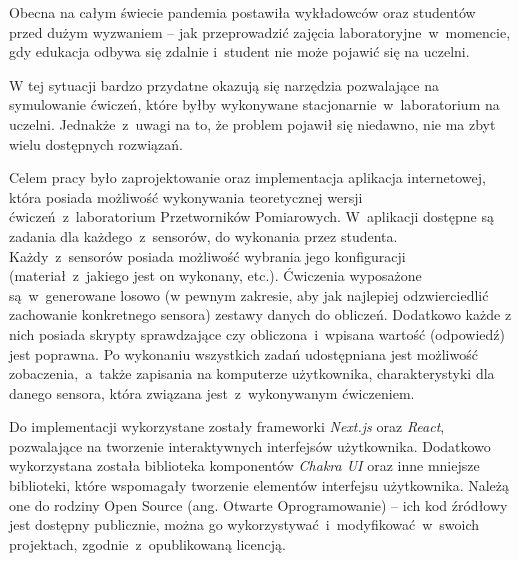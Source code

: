 Obecna na całym świecie pandemia postawiła wykładowców oraz studentów przed dużym wyzwaniem -- jak
przeprowadzić zajęcia laboratoryjne~w~momencie, gdy edukacja odbywa się zdalnie i~student nie może
pojawić się na uczelni.

W tej sytuacji bardzo przydatne okazują się narzędzia pozwalające na symulowanie ćwiczeń, które
byłby wykonywane stacjonarnie~w~laboratorium na uczelni. Jednakże~z~uwagi na to, że
problem pojawił się niedawno, nie ma zbyt wielu dostępnych rozwiązań.

Celem pracy było zaprojektowanie oraz implementacja aplikacja internetowej, która posiada możliwość
wykonywania teoretycznej wersji ćwiczeń~z~laboratorium Przetworników Pomiarowych. W~aplikacji
dostępne są zadania dla każdego~z~sensorów, do wykonania przez studenta. Każdy~z~sensorów posiada
możliwość wybrania jego konfiguracji (materiał~z~jakiego jest on wykonany, etc.). Ćwiczenia
wyposażone są~w~generowane losowo (w pewnym zakresie, aby jak najlepiej odzwierciedlić zachowanie
konkretnego sensora) zestawy danych do obliczeń. Dodatkowo każde z nich posiada skrypty sprawdzające
czy obliczona~i~wpisana wartość (odpowiedź) jest poprawna. Po wykonaniu wszystkich zadań
udostępniana jest możliwość zobaczenia,~a~także zapisania na komputerze użytkownika, charakterystyki
dla danego sensora, która związana jest~z~wykonywanym ćwiczeniem.

Do implementacji wykorzystane zostały frameworki \textit{Next.js} oraz \textit{React}, pozwalające
na tworzenie interaktywnych interfejsów użytkownika. Dodatkowo wykorzystana została biblioteka
komponentów \textit{Chakra UI} oraz inne mniejsze biblioteki, które wspomagały tworzenie elementów
interfejsu użytkownika. Należą one do rodziny Open Source (ang. Otwarte Oprogramowanie) -- ich kod
źródłowy jest dostępny publicznie, można go wykorzystywać~i~modyfikować~w~swoich projektach,
zgodnie~z~opublikowaną licencją.
